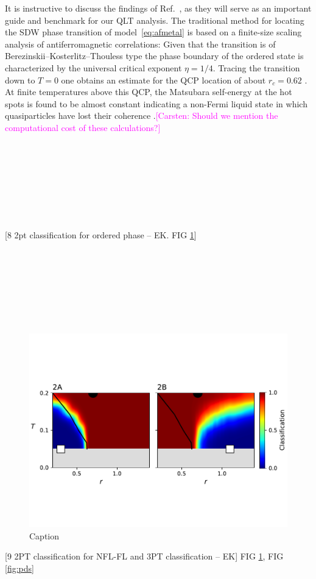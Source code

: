 \documentclass[amsmath,amssymb, aps, prx, longbibliography, twocolumn]{revtex4-1}
\newcommand{\cb}[1]{\textcolor{magenta}{[Carsten: #1]}}
\begin{document}
It is instructive to discuss the findings of Ref.~\cite{Gerlach2017}, as they will serve as an important guide and benchmark for our QLT analysis. The traditional method for locating the SDW phase transition of model~\eqref{eq:afmetal} is based on a finite-size scaling analysis of antiferromagnetic correlations: Given that the transition is of Berezinskii–Kosterlitz–Thouless type the phase boundary of the ordered state is characterized by the universal critical exponent $\eta = 1/4$. Tracing the transition down to $T=0$ one obtains an estimate for the QCP location of about $r_c = 0.62$ \cite{Gerlach2017}. At finite temperatures above this QCP, the Matsubara self-energy at the hot spots is found to be almost constant indicating a non-Fermi liquid state in which quasiparticles have lost their coherence \cite{Gerlach2017}.\cb{Should we mention the computational cost of these calculations?}
\\
\\
\\
\\
\\
\\
\\
\\
\\

[8 2pt classification for ordered phase -- EK. FIG \ref{fig:2ptsdw}]
\\
\\
\\
\\
\\
\\
\\
\\
 \begin{figure} [t]
    \centering
\includegraphics[width=.45\textwidth, trim={0 2.5cm 0 3cm}, clip]{2pt_sdw.pdf}
    \caption{Caption}
    \label{fig:2ptsdw}
\end{figure}

[9 2PT classification for NFL-FL and 3PT classification -- EK]
FIG \ref{fig:2ptsdw}, FIG \ref{fig:pds}
\\
\\
\\
\\
\\
\\
\\
\\
\end{document}
